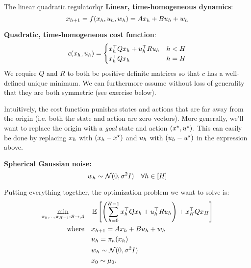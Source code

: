 \documentclass[\main/main]{subfiles}
\begin{document}
\begin{definition}{The linear quadratic regulator}{lqr}
    \textbf{Linear, time-homogeneous dynamics}: \[
        x_{h+1} = f(x_h, u_h, w_h) = A x_h + B u_h + w_h
    \]

    \noindent \textbf{Quadratic, time-homogeneous cost function}:
    \[
        c(x_h, u_h) = \begin{cases}
            x_h^\top Q x_h + u_h^\top R u_h & h < H \\
            x_h^\top Q x_h & h = H
        \end{cases}
    \]
    We require $Q$ and $R$ to both be positive definite matrices so that $c$ has a well-defined unique minimum. We can furthermore assume without loss of generality that they are both symmetric (see exercise below).

    Intuitively, the cost function punishes states and actions that are far away from the origin (i.e. both the state and action are zero vectors). More generally, we'll want to replace the origin with a \emph{goal} state and action $(x^\star, u^\star)$. This can easily be done by replacing $x_h$ with $(x_h - x^\star)$ and $u_h$ with $(u_h - u^\star)$ in the expression above.
    

    \noindent \textbf{Spherical Gaussian noise:} \[ w_h \sim \mathcal{N}(0, \sigma^2 I) \quad \forall h \in [H] \]

    \noindent Putting everything together, the optimization problem we want to solve is:
    \begin{align*}
        \min_{\pi_0, \dots, \pi_{H-1} : \mathcal{S} \to \mathcal{A}} \quad & \operatorname*{\mathbb{E}} \left[ \left( \sum_{h=0}^{H-1} x_h^\top Q x_h + u_h^\top R u_h \right) + x_H^\top Q x_H \right] \\
        \textrm{where} \quad & x_{h+1} = A x_h + B u_h + w_h \\
        & u_h = \pi_h (x_h) \\
        & w_h \sim \mathcal{N}(0, \sigma^2 I) \\
        & x_0 \sim \mu_0.
    \end{align*}
\end{definition}
\end{document}
